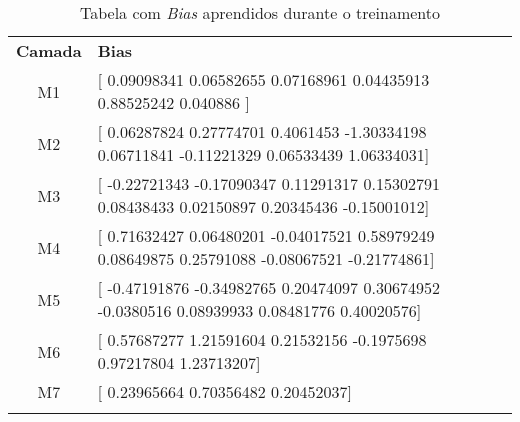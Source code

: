 \begin{table}
	\center
	\caption{Tabela com \emph{Bias} aprendidos durante o treinamento}
	\renewcommand{\arraystretch}{1.6}
	\begin{tabular}{c p{8.0cm}}
		\Xhline{6\arrayrulewidth}
		\textbf{Camada} &
			\textbf{Bias} \\
		\Xhline{2\arrayrulewidth}
		M1 & [
			0.09098341  0.06582655 0.07168961  0.04435913  0.88525242
			 0.040886  ] \\
		M2 & [
			0.06287824  0.27774701 0.4061453  -1.30334198 0.06711841
			-0.11221329 0.06533439  1.06334031] \\
		M3 & [
			-0.22721343 -0.17090347 0.11291317 0.15302791 0.08438433
			0.02150897 0.20345436 -0.15001012] \\ 
		M4 & [
			0.71632427 0.06480201 -0.04017521 0.58979249 0.08649875
			0.25791088 -0.08067521 -0.21774861] \\
		M5 & [
			-0.47191876 -0.34982765 0.20474097 0.30674952 -0.0380516
			0.08939933 0.08481776 0.40020576] \\
		M6 & [
			0.57687277 1.21591604 0.21532156 -0.1975698 0.97217804
			1.23713207] \\
		M7 & [
			0.23965664 0.70356482 0.20452037] \\
		
		\Xhline{6\arrayrulewidth}
	\end{tabular}
	\label{tbl:bias}
\end{table}

